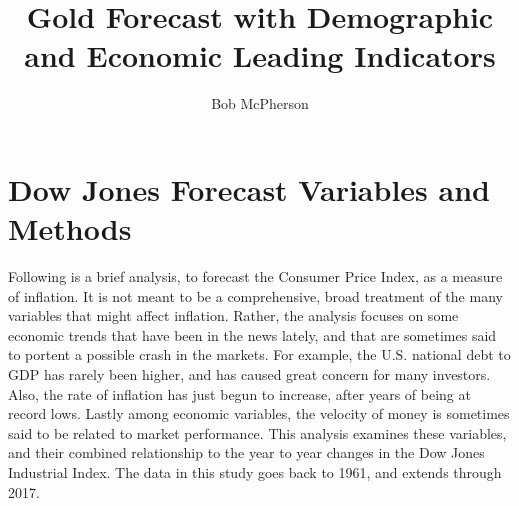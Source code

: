 \documentclass[12pt]{article}         %
\title{Gold Forecast with Demographic and Economic Leading Indicators}  %
\author{Bob McPherson}          %
\begin{document}




\maketitle              %

\section{Dow Jones Forecast Variables and Methods}

Following is a brief analysis, to forecast the Consumer Price Index, as a measure of inflation.  It is not meant to be a comprehensive, broad treatment of the many variables that might affect inflation.  Rather, the analysis focuses on some economic trends that have been in the news lately, and that are sometimes said to portent a possible crash in the markets.  For example, the U.S. national debt to GDP has rarely been higher, and has caused great concern for many investors.  Also, the rate of inflation has just begun to increase, after years of being at record lows.  Lastly among economic variables, the velocity of money is sometimes said to be related to market performance.  This analysis examines these variables, and their combined relationship to the year to year changes in the Dow Jones Industrial Index.  The data in this study goes back to 1961, and extends through 2017.
\end{document}
